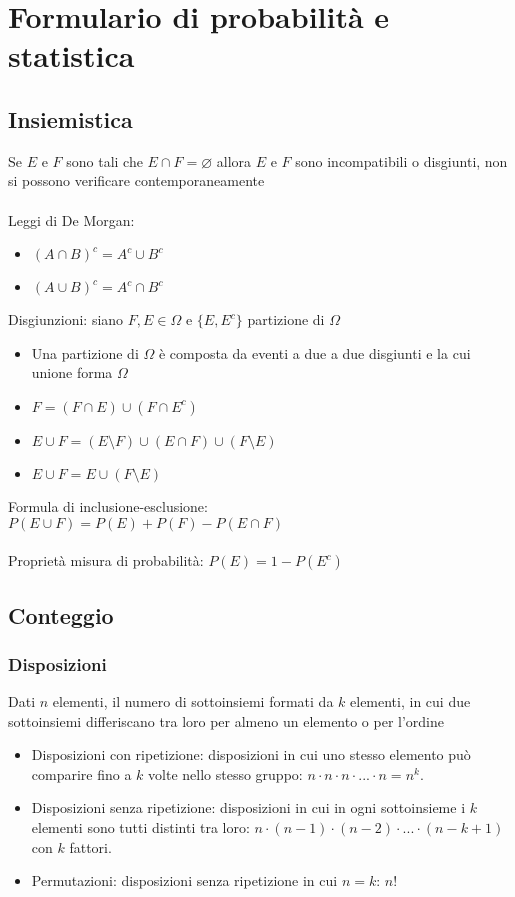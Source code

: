 \documentclass[10pt,a4paper]{article}
\begin{document}
\section*{Formulario di probabilità e statistica}
\setlength{\columnseprule}{0.5pt}
\def\columnseprulecolor{\color{black}}

\begin{multicols}{2}
\setlength{\columnsep}{0.5cm}

\subsection*{Insiemistica}
Se $E$ e $F$ sono tali che $E \cap F= \varnothing $ allora $E$ e $F$ sono incompatibili o disgiunti, non si possono verificare contemporaneamente\\\\
Leggi di De Morgan:
\begin{itemize}
	\item $(A \cap B)^c = A^c \cup B^c$
	\item $(A \cup B)^c = A^c \cap B^c$
\end{itemize}
Disgiunzioni: siano $F, E \in \Omega$ e $\{E,E^c\}$ partizione di $\Omega$
\begin{itemize}
    \item Una partizione di $\Omega$ è composta da eventi a due a due disgiunti e la cui unione forma $\Omega$
    \item $F=(F \cap E) \cup (F \cap E^c)$
    \item $E \cup F = (E \setminus F) \cup (E \cap F) \cup (F \setminus E)$
    \item $E \cup F = E \cup (F \setminus E)$
\end{itemize}
Formula di inclusione-esclusione: \\
$P(E \cup F) = P(E) + P(F) - P(E \cap F)$\\\\
Proprietà misura di probabilità: $P(E)=1-P(E^c)$
\subsection*{Conteggio}
\subsubsection*{Disposizioni}
Dati $n$ elementi, il numero di sottoinsiemi formati da $k$ elementi, in cui due sottoinsiemi differiscano tra loro per almeno un elemento o per l'ordine
\begin{itemize}
	\item Disposizioni con ripetizione: disposizioni in cui uno stesso elemento può comparire fino a $k$ volte nello stesso gruppo: $n\cdot n\cdot n\cdot...\cdot n = n^k$.
	\item Disposizioni senza ripetizione: disposizioni in cui in ogni sottoinsieme i $k$ elementi sono tutti distinti tra loro: $ n \cdot (n-1)\cdot (n-2) \cdot ... \cdot (n-k+1)$ con $k$ fattori.
	\item Permutazioni: disposizioni senza ripetizione in cui $n=k$: $n!$
\end{itemize}

\end{multicols}
\end{document}
